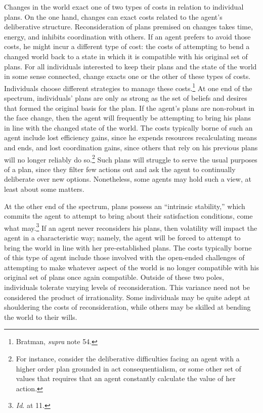 Changes in the world exact one of two types of costs in relation to
individual plans. On the one hand, changes can exact costs related to
the agent's deliberative structure. Reconsideration of plans premised on
changes takes time, energy, and inhibits coordination with others. If an
agent prefers to avoid those costs, he might incur a different type of
cost: the costs of attempting to bend a changed world back to a state in
which it is compatible with his original set of plans. For all
individuals interested to keep their plans and the state of the world in
some sense connected, change exacts one or the other of these types of
costs. Individuals choose different strategies to manage these
costs.\footnote{Bratman, \emph{supra} note 54.} At one end of the
spectrum, individuals' plans are only as strong as the set of beliefs
and desires that formed the original basis for the plan. If the agent's
plans are non-robust in the face change, then the agent will frequently
be attempting to bring his plans in line with the changed state of the
world. The costs typically borne of such an agent include lost
efficiency gains, since he expends resources recalculating means and
ends, and lost coordination gains, since others that rely on his
previous plans will no longer reliably do so.\footnote{For instance,
  consider the deliberative difficulties facing an agent with a higher
  order plan grounded in act consequentialism, or some other set of
  values that requires that an agent constantly calculate the value of
  her action.} Such plans will struggle to serve the usual purposes of a
plan, since they filter few actions out and ask the agent to continually
deliberate over new options. Nonetheless, some agents may hold such a
view, at least about some matters.

At the other end of the spectrum, plans possess an ``intrinsic
stability,'' which commits the agent to attempt to bring about their
satisfaction conditions, come what may.\footnote{\emph{Id}. at 11.} If
an agent never reconsiders his plans, then volatility will impact the
agent in a characteristic way; namely, the agent will be forced to
attempt to bring the world in line with her pre-established plans. The
costs typically borne of this type of agent include those involved with
the open-ended challenges of attempting to make whatever aspect of the
world is no longer compatible with his original set of plans once again
compatible. Outside of these two poles, individuals tolerate varying
levels of reconsideration. This variance need not be considered the
product of irrationality. Some individuals may be quite adept at
shouldering the costs of reconsideration, while others may be skilled at
bending the world to their wills.

